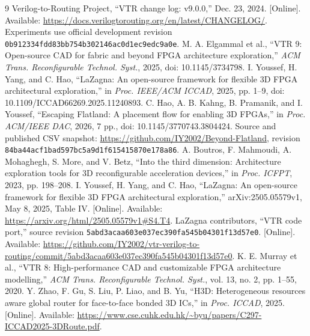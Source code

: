 \documentclass[conference,10pt]{IEEEtran}
\begin{document}
\clearpage



\begin{thebibliography}{9}
 Verilog-to-Routing Project, ``VTR change log: v9.0.0,'' Dec. 23, 2024. [Online]. Available: \url{https://docs.verilogtorouting.org/en/latest/CHANGELOG/}. Experiments use official development revision \texttt{0b912334fdd83bb754b302146ac0d1ec9edc9a0e}.
 M. A. Elgammal et al., ``VTR 9: Open-source CAD for fabric and beyond FPGA architecture exploration,'' \emph{ACM Trans. Reconfigurable Technol. Syst.}, 2025, doi: 10.1145/3734798.
 I. Youssef, H. Yang, and C. Hao, ``LaZagna: An open-source framework for flexible 3D FPGA architectural exploration,'' in \emph{Proc. IEEE/ACM ICCAD}, 2025, pp. 1--9, doi: 10.1109/ICCAD66269.2025.11240893.
 C. Hao, A. B. Kahng, B. Pramanik, and I. Youssef, ``Escaping Flatland: A placement flow for enabling 3D FPGAs,'' in \emph{Proc. ACM/IEEE DAC}, 2026, 7 pp., doi: 10.1145/3770743.3804424. Source and published CSV snapshot: \url{https://github.com/IY2002/Beyond-Flatland}, revision \texttt{84ba44acf1bad597bc5a9d1f615415870e178a86}.
 A. Boutros, F. Mahmoudi, A. Mohaghegh, S. More, and V. Betz, ``Into the third dimension: Architecture exploration tools for 3D reconfigurable acceleration devices,'' in \emph{Proc. ICFPT}, 2023, pp. 198--208.
 I. Youssef, H. Yang, and C. Hao, ``LaZagna: An open-source framework for flexible 3D FPGA architectural exploration,'' arXiv:2505.05579v1, May 8, 2025, Table IV. [Online]. Available: \url{https://arxiv.org/html/2505.05579v1#S4.T4}.
 LaZagna contributors, ``VTR code port,'' source revision \texttt{5abd3acaa603e037ec390fa545b04301f13d57e0}. [Online]. Available: \url{https://github.com/IY2002/vtr-verilog-to-routing/commit/5abd3acaa603e037ec390fa545b04301f13d57e0}.
 K. E. Murray et al., ``VTR 8: High-performance CAD and customizable FPGA architecture modelling,'' \emph{ACM Trans. Reconfigurable Technol. Syst.}, vol. 13, no. 2, pp. 1--55, 2020.
 Y. Zhao, F. Gu, S. Liu, P. Liao, and B. Yu, ``H3D: Heterogeneous resources aware global router for face-to-face bonded 3D ICs,'' in \emph{Proc. ICCAD}, 2025. [Online]. Available: \url{https://www.cse.cuhk.edu.hk/~byu/papers/C297-ICCAD2025-3DRoute.pdf}.
\end{thebibliography}
\end{document}
